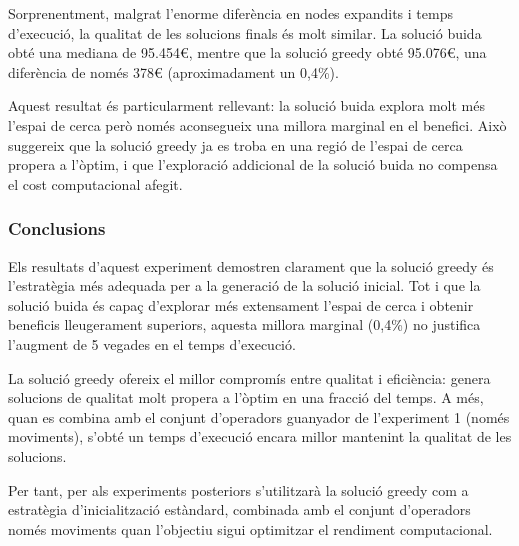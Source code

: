 Sorprenentment, malgrat l'enorme diferència en nodes expandits i temps d'execució, la qualitat de les solucions finals és molt similar. La solució buida obté una mediana de 95.454€, mentre que la solució greedy obté 95.076€, una diferència de només 378€ (aproximadament un 0,4\%).

Aquest resultat és particularment rellevant: la solució buida explora molt més l'espai de cerca però només aconsegueix una millora marginal en el benefici. Això suggereix que la solució greedy ja es troba en una regió de l'espai de cerca propera a l'òptim, i que l'exploració addicional de la solució buida no compensa el cost computacional afegit.

\subsubsection{Conclusions}

Els resultats d'aquest experiment demostren clarament que la solució greedy és l'estratègia més adequada per a la generació de la solució inicial. Tot i que la solució buida és capaç d'explorar més extensament l'espai de cerca i obtenir beneficis lleugerament superiors, aquesta millora marginal (0,4\%) no justifica l'augment de 5 vegades en el temps d'execució.

La solució greedy ofereix el millor compromís entre qualitat i eficiència: genera solucions de qualitat molt propera a l'òptim en una fracció del temps. A més, quan es combina amb el conjunt d'operadors guanyador de l'experiment 1 (només moviments), s'obté un temps d'execució encara millor mantenint la qualitat de les solucions.

Per tant, per als experiments posteriors s'utilitzarà la solució greedy com a estratègia d'inicialització estàndard, combinada amb el conjunt d'operadors només moviments quan l'objectiu sigui optimitzar el rendiment computacional.